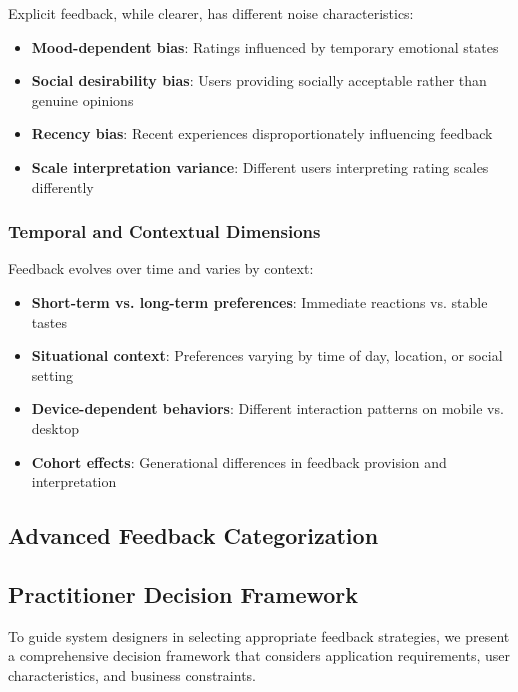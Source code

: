 Explicit feedback, while clearer, has different noise characteristics:
\begin{itemize}
    \item \textbf{Mood-dependent bias}: Ratings influenced by temporary emotional states
    \item \textbf{Social desirability bias}: Users providing socially acceptable rather than genuine opinions
    \item \textbf{Recency bias}: Recent experiences disproportionately influencing feedback
    \item \textbf{Scale interpretation variance}: Different users interpreting rating scales differently
\end{itemize}

\subsubsection{Temporal and Contextual Dimensions}

Feedback evolves over time and varies by context:
\begin{itemize}
    \item \textbf{Short-term vs. long-term preferences}: Immediate reactions vs. stable tastes
    \item \textbf{Situational context}: Preferences varying by time of day, location, or social setting
    \item \textbf{Device-dependent behaviors}: Different interaction patterns on mobile vs. desktop
    \item \textbf{Cohort effects}: Generational differences in feedback provision and interpretation
\end{itemize}

\subsection{Advanced Feedback Categorization}

\subsection{Practitioner Decision Framework}

To guide system designers in selecting appropriate feedback strategies, we present a comprehensive decision framework that considers application requirements, user characteristics, and business constraints.

